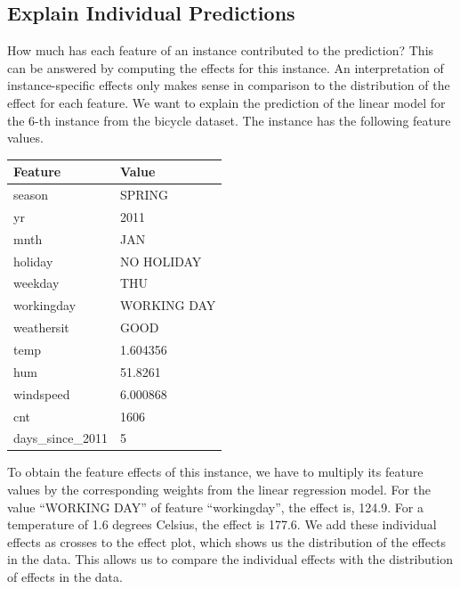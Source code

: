 \documentclass[12pt,]{krantz}
\begin{document}
\subsection{Explain Individual
Predictions}\label{explain-individual-predictions}

How much has each feature of an instance contributed to the prediction?
This can be answered by computing the effects for this instance. An
interpretation of instance-specific effects only makes sense in
comparison to the distribution of the effect for each feature. We want
to explain the prediction of the linear model for the 6-th instance from
the bicycle dataset. The instance has the following feature values.

\begin{tabular}{l|l}
\hline
Feature & Value\\
\hline
season & SPRING\\
\hline
yr & 2011\\
\hline
mnth & JAN\\
\hline
holiday & NO HOLIDAY\\
\hline
weekday & THU\\
\hline
workingday & WORKING DAY\\
\hline
weathersit & GOOD\\
\hline
temp & 1.604356\\
\hline
hum & 51.8261\\
\hline
windspeed & 6.000868\\
\hline
cnt & 1606\\
\hline
days\_since\_2011 & 5\\
\hline
\end{tabular}

To obtain the feature effects of this instance, we have to multiply its
feature values by the corresponding weights from the linear regression
model. For the value ``WORKING DAY'' of feature ``workingday'', the
effect is, 124.9. For a temperature of 1.6 degrees Celsius, the effect
is 177.6. We add these individual effects as crosses to the effect plot,
which shows us the distribution of the effects in the data. This allows
us to compare the individual effects with the distribution of effects in
the data.
\end{document}

